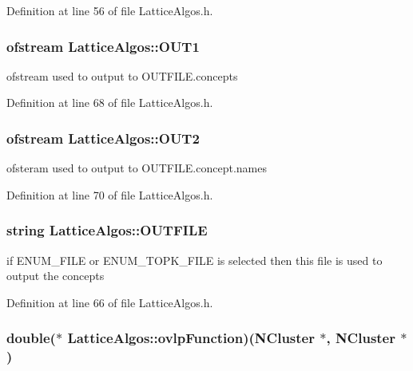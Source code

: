 Definition at line 56 of file LatticeAlgos.h.

\hypertarget{class_lattice_algos_a5e06ea8a8e76d5b6019481e778655a5c}{
\subsubsection[{OUT1}]{\setlength{\rightskip}{0pt plus 5cm}ofstream {\bf LatticeAlgos::OUT1}}}
\label{class_lattice_algos_a5e06ea8a8e76d5b6019481e778655a5c}


ofstream used to output to OUTFILE.concepts 



Definition at line 68 of file LatticeAlgos.h.

\hypertarget{class_lattice_algos_ad6ee83e69ef859717cbc747edf4fc306}{
\subsubsection[{OUT2}]{\setlength{\rightskip}{0pt plus 5cm}ofstream {\bf LatticeAlgos::OUT2}}}
\label{class_lattice_algos_ad6ee83e69ef859717cbc747edf4fc306}


ofsteram used to output to OUTFILE.concept.names 



Definition at line 70 of file LatticeAlgos.h.

\hypertarget{class_lattice_algos_aaf79cc2e8513fd28bf1e9329c3e678ab}{
\subsubsection[{OUTFILE}]{\setlength{\rightskip}{0pt plus 5cm}string {\bf LatticeAlgos::OUTFILE}}}
\label{class_lattice_algos_aaf79cc2e8513fd28bf1e9329c3e678ab}


if ENUM\_\-FILE or ENUM\_\-TOPK\_\-FILE is selected then this file is used to output the concepts 



Definition at line 66 of file LatticeAlgos.h.

\hypertarget{class_lattice_algos_ad2bd9f8cb22cb27dfe527dd2bc38ec2d}{
\subsubsection[{ovlpFunction}]{\setlength{\rightskip}{0pt plus 5cm}double($\ast$ {\bf LatticeAlgos::ovlpFunction})({\bf NCluster} $\ast$, {\bf NCluster} $\ast$)}}
\label{class_lattice_algos_ad2bd9f8cb22cb27dfe527dd2bc38ec2d}


